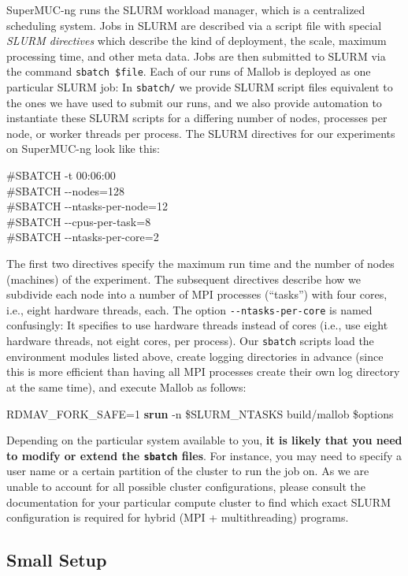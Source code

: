 \documentclass[runningheads]{article}
\numberwithin{dummy}{subsection}
\begin{document}
SuperMUC-ng runs the SLURM workload manager, which is a centralized scheduling system.
Jobs in SLURM are described via a script file with special \textit{SLURM directives} which describe the kind of deployment, the scale, maximum processing time, and other meta data.
Jobs are then submitted to SLURM via the command \texttt{sbatch \$file}.
Each of our runs of Mallob is deployed as one particular SLURM job: In \texttt{sbatch/} we provide SLURM script files equivalent to the ones we have used to submit our runs, and we also provide automation to instantiate these SLURM scripts for a differing number of nodes, processes per node, or worker threads per process.
The SLURM directives for our experiments on SuperMUC-ng look like this:
\begin{ttfenv}
\#SBATCH -t 00:06:00\\
\#SBATCH -{}-nodes=128\\
\#SBATCH -{}-ntasks-per-node=12\\
\#SBATCH -{}-cpus-per-task=8\\
\#SBATCH -{}-ntasks-per-core=2
\end{ttfenv}
The first two directives specify the maximum run time and the number of nodes (machines) of the experiment.
The subsequent directives describe how we subdivide each node into a number of MPI processes (``tasks'') with four cores, i.e., eight hardware threads, each.
The option \texttt{-{}-ntasks-per-core} is named confusingly: It specifies to use hardware threads instead of cores (i.e., use eight hardware threads, not eight cores, per process).
Our \texttt{sbatch} scripts load the environment modules listed above, create logging directories in advance (since this is more efficient than having all MPI processes create their own log directory at the same time), and execute Mallob as follows:
\begin{ttfenv}
RDMAV\_FORK\_SAFE=1 \textbf{srun} -n \$SLURM\_NTASKS build/mallob \$options
\end{ttfenv}

Depending on the particular system available to you, \textbf{it is likely that you need to modify or extend the \texttt{sbatch} files}.
For instance, you may need to specify a user name or a certain partition of the cluster to run the job on.
As we are unable to account for all possible cluster configurations, please consult the documentation for your particular compute cluster to find which exact SLURM configuration is required for hybrid (MPI + multithreading) programs.

\subsection{Small Setup}
\label{sec:small-setup}
\end{document}
